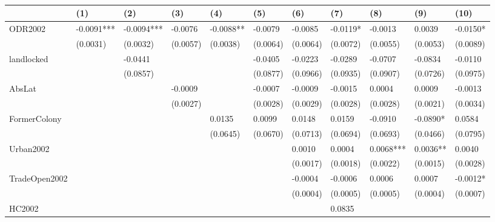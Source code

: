 \begin{table}
\caption{}
\label{}
\begin{center}
\begin{tabular}{lllllllllll}
\hline
               & (1)        & (2)        & (3)      & (4)       & (5)      & (6)      & (7)      & (8)        & (9)        & (10)       \\
\hline
ODR2002        & -0.0091*** & -0.0094*** & -0.0076  & -0.0088** & -0.0079  & -0.0085  & -0.0119* & -0.0013    & 0.0039     & -0.0150*   \\
               & (0.0031)   & (0.0032)   & (0.0057) & (0.0038)  & (0.0064) & (0.0064) & (0.0072) & (0.0055)   & (0.0053)   & (0.0089)   \\
landlocked     &            & -0.0441    &          &           & -0.0405  & -0.0223  & -0.0289  & -0.0707    & -0.0834    & -0.0110    \\
               &            & (0.0857)   &          &           & (0.0877) & (0.0966) & (0.0935) & (0.0907)   & (0.0726)   & (0.0975)   \\
AbsLat         &            &            & -0.0009  &           & -0.0007  & -0.0009  & -0.0015  & 0.0004     & 0.0009     & -0.0013    \\
               &            &            & (0.0027) &           & (0.0028) & (0.0029) & (0.0028) & (0.0028)   & (0.0021)   & (0.0034)   \\
FormerColony   &            &            &          & 0.0135    & 0.0099   & 0.0148   & 0.0159   & -0.0910    & -0.0890*   & 0.0584     \\
               &            &            &          & (0.0645)  & (0.0670) & (0.0713) & (0.0694) & (0.0693)   & (0.0466)   & (0.0795)   \\
Urban2002      &            &            &          &           &          & 0.0010   & 0.0004   & 0.0068***  & 0.0036**   & 0.0040     \\
               &            &            &          &           &          & (0.0017) & (0.0018) & (0.0022)   & (0.0015)   & (0.0028)   \\
TradeOpen2002  &            &            &          &           &          & -0.0004  & -0.0006  & 0.0006     & 0.0007     & -0.0012*   \\
               &            &            &          &           &          & (0.0004) & (0.0005) & (0.0005)   & (0.0004)   & (0.0007)   \\
HC2002         &            &            &          &           &          &          & 0.0835   &            &            &            \\

\end{tabular}
\end{center}
\end{table}
